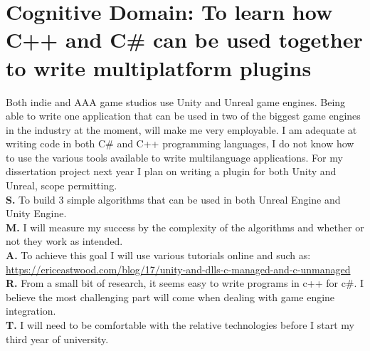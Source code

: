 \documentclass{scrartcl}
\begin{document}
\section{Cognitive Domain: To learn how C++ and C\#  can be used together to write multiplatform plugins}
Both indie and AAA game studios use Unity and Unreal game engines. Being able to write one application that can be used in two of the biggest game engines in the industry at the moment, will make me very employable. 
I am adequate at writing code in both C\# and C++ programming languages, I do not know how to use the various tools available to write multilanguage applications. For my dissertation project next year I plan on writing a plugin for
both Unity and Unreal, scope permitting.\\
\textbf{S.} To build 3 simple algorithms that can be used in both Unreal Engine and Unity Engine.\\
\textbf{M.} I will measure my success by the complexity of the algorithms and whether or not they work as intended.\\
\textbf{A.} To achieve this goal I will use various tutorials online and such as:
 \href{url}{https://ericeastwood.com/blog/17/unity-and-dlls-c-managed-and-c-unmanaged}\\
\textbf{R.} From a small bit of research, it seems easy to write programs in c++ for c\#. I believe the most challenging part will come when dealing with game engine integration.\\
\textbf{T.} I will need to be comfortable with the relative technologies before I start my third year of university. \\
\end{document}
